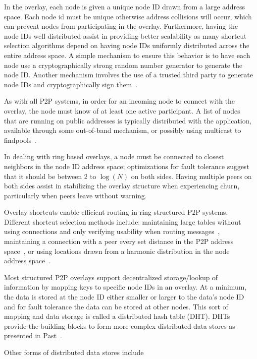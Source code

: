 \documentclass[letterpaper,twocolumn,10pt]{article}
\begin{document}
In the overlay, each node is given a unique node ID drawn from a large address
space.  Each node id must be unique otherwise address collisions will occur,
which can prevent nodes from participating in the overlay.  Furthermore, having
the node IDs well distributed assist in providing better scalability as many
shortcut selection algorithms depend on having node IDs uniformly distributed
across the entire address space.  A simple mechanism to ensure this behavior is
to have each node use a cryptographically strong random number generator to
generate the node ID.  Another mechanism involves the use of a trusted third
party to generate node IDs and cryptographically sign them~\cite{secure_routing}.

As with all P2P systems, in order for an incoming node to connect with
the overlay, the node must know of at least one active participant.  A list of
nodes that are running on public addresses is typically distributed with the
application, available through some out-of-band mechanism, or possibly using
multicast to findpools~\cite{pastry}.

In dealing with ring based overlays, a node must be connected to closest
neighbors in the node ID address space; optimizations for fault tolerance
suggest that it should be between 2 to $\log(N)$ on both sides.  Having
multiple peers on both sides assist in stabilizing the overlay structure
when experiencing churn, particularly when peers leave without warning.

Overlay shortcuts enable efficient routing in ring-structured P2P systems.
Different shortcut selection methods include: maintaining large tables without
using connections and only verifying usability when routing
messages~\cite{pastry, kademlia}, maintaining a connection with a peer every
set distance in the P2P address space~\cite{chord}, or using locations drawn
from a harmonic distribution in the node address space~\cite{symphony}.

Most structured P2P overlays support decentralized storage/lookup of information by
mapping keys to specific node IDs in an overlay.  At a minimum, the data is stored
at the node ID either smaller or larger to the data's node ID and for fault
tolerance the data can be stored at other nodes.  This sort of mapping
and data storage is called a distributed hash table (DHT).  DHTs provide the
building blocks to form more complex distributed data stores as presented in
Past~\cite{past}.

Other forms of distributed data stores include 
\end{document}
